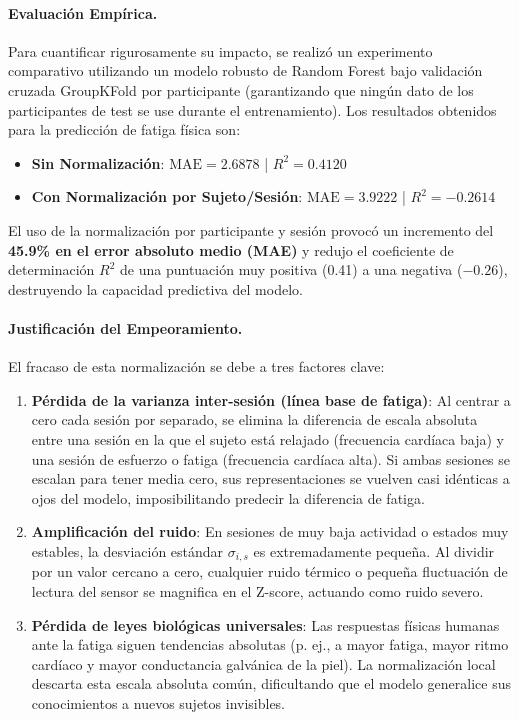 \documentclass[12pt, a4paper]{article}
\begin{document}
\paragraph{Evaluación Empírica.}
Para cuantificar rigurosamente su impacto, se realizó un experimento comparativo utilizando un modelo robusto de Random Forest bajo validación cruzada GroupKFold por participante (garantizando que ningún dato de los participantes de test se use durante el entrenamiento). Los resultados obtenidos para la predicción de fatiga física son:
\begin{itemize}
    \item \textbf{Sin Normalización}: $\text{MAE} = 2.6878$ | $R^2 = 0.4120$
    \item \textbf{Con Normalización por Sujeto/Sesión}: $\text{MAE} = 3.9222$ | $R^2 = -0.2614$
\end{itemize}

El uso de la normalización por participante y sesión provocó un incremento del \textbf{45.9\% en el error absoluto medio (MAE)} y redujo el coeficiente de determinación $R^2$ de una puntuación muy positiva (0.41) a una negativa ($-0.26$), destruyendo la capacidad predictiva del modelo.

\paragraph{Justificación del Empeoramiento.}
El fracaso de esta normalización se debe a tres factores clave:
\begin{enumerate}
    \item \textbf{Pérdida de la varianza inter-sesión (línea base de fatiga)}: Al centrar a cero cada sesión por separado, se elimina la diferencia de escala absoluta entre una sesión en la que el sujeto está relajado (frecuencia cardíaca baja) y una sesión de esfuerzo o fatiga (frecuencia cardíaca alta). Si ambas sesiones se escalan para tener media cero, sus representaciones se vuelven casi idénticas a ojos del modelo, imposibilitando predecir la diferencia de fatiga.
    \item \textbf{Amplificación del ruido}: En sesiones de muy baja actividad o estados muy estables, la desviación estándar $\sigma_{i,s}$ es extremadamente pequeña. Al dividir por un valor cercano a cero, cualquier ruido térmico o pequeña fluctuación de lectura del sensor se magnifica en el Z-score, actuando como ruido severo.
    \item \textbf{Pérdida de leyes biológicas universales}: Las respuestas físicas humanas ante la fatiga siguen tendencias absolutas (p. ej., a mayor fatiga, mayor ritmo cardíaco y mayor conductancia galvánica de la piel). La normalización local descarta esta escala absoluta común, dificultando que el modelo generalice sus conocimientos a nuevos sujetos invisibles.
\end{enumerate}
\end{document}
